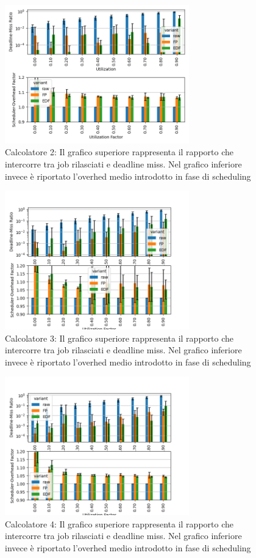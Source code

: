 \documentclass[conference]{IEEEtran}
\begin{document}
    \begin{figure}[hbt!]
    \includegraphics[width=8cm]{generated_2.png}
    \centering
    \caption{Calcolatore 2: Il grafico superiore rappresenta il rapporto che intercorre tra job rilasciati e deadline miss. Nel grafico inferiore invece è riportato l'overhed medio introdotto in fase di scheduling}
    \end{figure}

    \begin{figure}[hbt!]
    \includegraphics[width=8cm]{generated_3.png}
    \centering
    \caption{Calcolatore 3: Il grafico superiore rappresenta il rapporto che intercorre tra job rilasciati e deadline miss. Nel grafico inferiore invece è riportato l'overhed medio introdotto in fase di scheduling}
    \end{figure}
    
    \begin{figure}[hbt!]
    \includegraphics[width=8cm]{generated_4.png}
    \centering
    \caption{Calcolatore 4: Il grafico superiore rappresenta il rapporto che intercorre tra job rilasciati e deadline miss. Nel grafico inferiore invece è riportato l'overhed medio introdotto in fase di scheduling}
    \end{figure}
    
\end{document}
